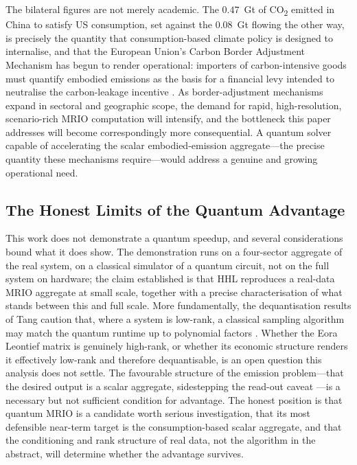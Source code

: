 \documentclass[letterpaper, 10 pt, conference]{ieeeconf}
\newcommand{\COO}{CO\textsubscript{2}}
\begin{document}
The bilateral figures are not merely academic. The $0.47$~Gt of \COO{} emitted in China to satisfy US consumption, set against the $0.08$~Gt flowing the other way, is precisely the quantity that consumption-based climate policy is designed to internalise, and that the European Union's Carbon Border Adjustment Mechanism has begun to render operational: importers of carbon-intensive goods must quantify embodied emissions as the basis for a financial levy intended to neutralise the carbon-leakage incentive \cite{cbam2023}. As border-adjustment mechanisms expand in sectoral and geographic scope, the demand for rapid, high-resolution, scenario-rich MRIO computation will intensify, and the bottleneck this paper addresses will become correspondingly more consequential. A quantum solver capable of accelerating the scalar embodied-emission aggregate---the precise quantity these mechanisms require---would address a genuine and growing operational need.

\subsection{The Honest Limits of the Quantum Advantage}

This work does not demonstrate a quantum speedup, and several considerations bound what it does show. The demonstration runs on a four-sector aggregate of the real system, on a classical simulator of a quantum circuit, not on the full system on hardware; the claim established is that HHL reproduces a real-data MRIO aggregate at small scale, together with a precise characterisation of what stands between this and full scale. More fundamentally, the dequantisation results of Tang caution that, where a system is low-rank, a classical sampling algorithm may match the quantum runtime up to polynomial factors \cite{tang2019}. Whether the Eora Leontief matrix is genuinely high-rank, or whether its economic structure renders it effectively low-rank and therefore dequantisable, is an open question this analysis does not settle. The favourable structure of the emission problem---that the desired output is a scalar aggregate, sidestepping the read-out caveat \cite{aaronson2015}---is a necessary but not sufficient condition for advantage. The honest position is that quantum MRIO is a candidate worth serious investigation, that its most defensible near-term target is the consumption-based scalar aggregate, and that the conditioning and rank structure of real data, not the algorithm in the abstract, will determine whether the advantage survives.
\end{document}
